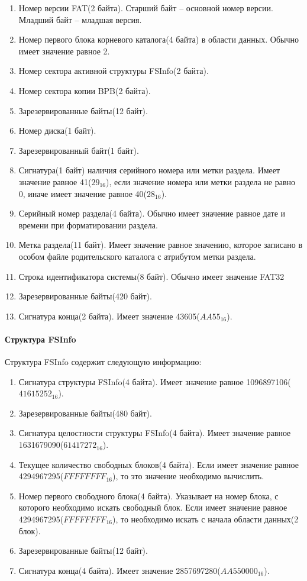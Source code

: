 \begin{enumerate}
\item Номер версии FAT(2 байта). Старший байт -- основной номер версии. Младший байт -- младшая версия. 
\item Номер первого блока корневого каталога(4 байта) в области данных. Обычно имеет значение равное 2.
\item Номер сектора активной структуры FSInfo(2 байта). 
\item Номер сектора копии BPB(2 байта).
\item Зарезервированные байты(12 байт).
\item Номер диска(1 байт).
\item Зарезервированный байт(1 байт).
\item Сигнатура(1 байт) наличия серийного номера или метки раздела. Имеет значение равное 41($29_{16}$), если значение номера или метки раздела не равно 0, иначе имеет значение равное 40($28_{16}$).
\item Серийный номер раздела(4 байта). Обычно имеет значение равное дате и времени при форматировании раздела.
\item Метка раздела(11 байт). Имеет значение равное значению, которое записано в особом файле родительского каталога с атрибутом метки раздела.
\item Строка идентификатора системы(8 байт). Обычно имеет значение \textquotedbl FAT32~~~\textquotedbl\
\item Зарезервированные байты(420 байт).
\item Сигнатура конца(2 байта). Имеет значение 43605($AA55_{16}$).
\end{enumerate}

\paragraph{Структура FSInfo}

Структура FSInfo содержит следующую информацию:

\begin{enumerate}
\item Сигнатура структуры FSInfo(4 байта). Имеет значение равное 1096897106($41615252_{16}$).
\item Зарезервированные байты(480 байт).
\item Сигнатура целостности структуры FSInfo(4 байта). Имеет значение равное 1631679090($61417272_{16}$).
\item Текущее количество свободных блоков(4 байта). Если имеет значение равное 4294967295($FFFFFFFF_{16}$), то это значение необходимо вычислить.
\item Номер первого свободного блока(4 байта). Указывает на номер блока, с которого необходимо искать свободный блок. Если имеет значение равное 4294967295($FFFFFFFF_{16}$), то необходимо искать с начала области данных(2 блок).
\item Зарезервированные байты(12 байт).
\item Сигнатура конца(4 байта). Имеет значение 2857697280($AA550000_{16}$).
\end{enumerate}

